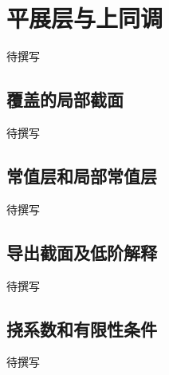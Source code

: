 
% 
% 

\section{平展层与上同调}
\label{g5:sec:3502}

待撰写

\subsection{覆盖的局部截面}
\label{g5:subsec:3502:01}
待撰写

\subsection{常值层和局部常值层}
\label{g5:subsec:3502:02}
待撰写

\subsection{导出截面及低阶解释}
\label{g5:subsec:3502:03}
待撰写

\subsection{挠系数和有限性条件}
\label{g5:subsec:3502:04}
待撰写
